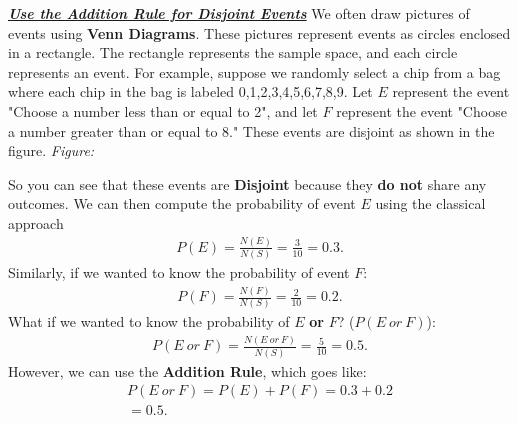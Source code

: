 \documentclass{report}
\begin{document}
    \pagebreak \bigbreak \noindent
    \textbf{\textit{\underline{Use the Addition Rule for Disjoint Events}}}
    \bigbreak \noindent 
    We often draw  pictures of events using \textbf{Venn Diagrams}. These pictures represent events as circles enclosed in a rectangle. The
    rectangle represents the sample space, and each circle represents an event. For example, suppose we randomly select a 
    chip from a bag where each chip in the bag is labeled 0,1,2,3,4,5,6,7,8,9. Let $E $ represent the event "Choose a number less than or equal to 2",
    and let $F $ represent the event "Choose a number greater than or equal to 8." These events are disjoint as shown in the figure.
    \bigbreak \noindent 
    \textit{Figure:}
    \begin{figure}[ht]
        \centering
        \label{fig:figab}
    \end{figure}
    \bigbreak \noindent 
    So you can see that these events are \textbf{Disjoint} because they \textbf{do not} share any outcomes.
    \bigbreak \noindent 
    We can then compute the probability of event $E$ using the classical approach
    \begin{align*}
        P(E) = \frac{N(E)}{N(S)} = \frac{3}{10} = 0.3
    .\end{align*}
    \bigbreak \noindent 
    Similarly,  if we wanted to know the probability of event $F$: 
    \begin{align*}
        P(F) = \frac{N(F)}{N(S)} = \frac{2}{10} = 0.2
    .\end{align*}
    \bigbreak \noindent 
    What if we wanted to know the probability of $E$ \textbf{or} $F $? ($P(E\ or\ F)$):
    \begin{align*}
        P(E\ or\ F) = \frac{N(E\ or\ F)}{N(S)} = \frac{5}{10} = 0.5 
    .\end{align*}
    \bigbreak \noindent 
    However, we can use the \textbf{Addition Rule}, which goes like:
    \begin{align*}
     P(E\ or\ F) = P(E) + P(F) = 0.3 + 0.2  \\
     = 0.5
    .\end{align*}
\end{document}
